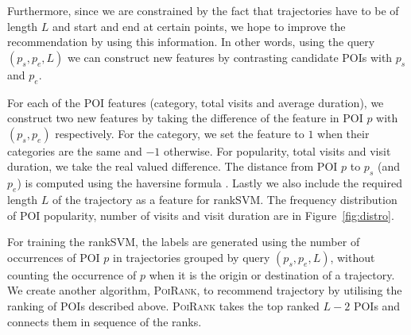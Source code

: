 Furthermore, since we are constrained by the fact that trajectories have to be of length $L$ and start and end at certain points, we hope to improve the recommendation by using this information.
In other words, using the query $(p_s, p_e, L)$ we can construct new features by contrasting
candidate POIs with $p_s$ and $p_e$.

For each of the POI features (category, total visits and average duration),
we construct two new features by taking the difference of
the feature in POI $p$ with $(p_s, p_e)$ respectively.
For the category, we set the feature to $1$ when their categories are the same and $-1$ otherwise.
For popularity, total visits and visit duration, we take the real valued difference.
The distance from POI $p$ to $p_s$ (and $p_e$) is computed using the haversine formula \cite{haversine}.
Lastly we also include the required length $L$ of the trajectory as a feature for rankSVM.
The frequency distribution of POI popularity, number of visits and visit duration are in Figure~\ref{fig:distro}.

For training the rankSVM, the labels are generated using the number of occurrences of
POI $p$ in trajectories grouped by query $(p_s, p_e, L)$,
without counting the occurrence of $p$ when it is the origin or destination of a trajectory.
We create another algorithm, \textsc{PoiRank}, to recommend trajectory by utilising
the ranking of POIs described above. \textsc{PoiRank} takes the top ranked $L-2$ POIs
and connects them in sequence of the ranks.



